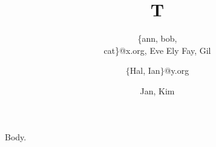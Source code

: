 \documentclass{article}
\begin{document}
\title{T}
\author{\{ann, bob,\\ cat\}@x.org, Eve Ely {Fay, Gil}
\and $\lbrace$Hal, Ian$\rbrace$@y.org
\and \textbraceleft Jan, Kim\textbraceright}
\maketitle
Body.
\end{document}
